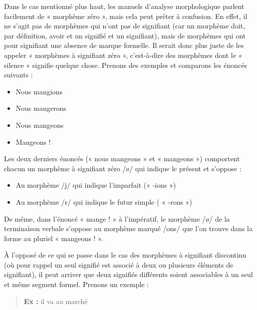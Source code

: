 Dans le cas mentionné plus haut, les manuels d’analyse morphologique parlent facilement de « morphème zéro », mais cela peut prêter à confusion. En effet, il ne s’agit pas de morphèmes qui n’ont pas de signifiant (car un morphème doit, par définition, avoir et un signifié et un signifiant), mais de morphèmes qui ont pour signifiant une absence de marque formelle. Il serait donc plus juste de les appeler « morphèmes à signifiant zéro », c’est-à-dire des morphèmes dont le « silence » signifie quelque chose. Prenons des exemples et comparons les énoncés suivants :
\begin{itemize}
\item Nous mangions 
\item Nous mangerons 
\item Nous mangeons 
\item Mangeons ! 
\end{itemize}
Les deux derniers énoncés (« nous mangeons » et « mangeons ») comportent chacun un morphème à signifiant zéro /ø/ qui indique le présent et s’oppose :
\begin{itemize}
\item Au morphème /j/ qui indique l’imparfait (« -ions »)
\item Au morphème /r/ qui indique le futur simple ( « -rons »)
\end{itemize}
De même, dans l’énoncé « mange ! » à l’impératif, le morphème /ø/ de la terminaison verbale s’oppose au morphème marqué /ons/ que l’on trouve dans la forme au pluriel « mangeons ! ».

À l’opposé de ce qui se passe dans le cas des morphèmes à signifiant discontinu (où pour rappel un seul signifié est associé à deux ou plusieurs éléments de signifiant), il peut arriver que deux signifiés différents soient associables à un seul et même segment formel. Prenons un exemple :
\begin{quote}\textbf{Ex :} il va au marché \end{quote}

